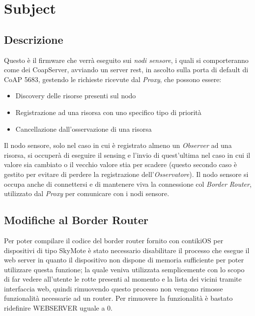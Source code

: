 \chapter{Subject}
  \section{Descrizione}
    Questo è il firmware che verrà eseguito sui \textit{nodi sensore}, i quali si comporteranno come dei CoapServer, avviando un server rest, in ascolto sulla porta di default
    di CoAP 5683, gestendo le richieste ricevute dal \textit{Proxy}, che possono essere:
    \begin{itemize}
      \item Discovery delle risorse presenti sul nodo
      \item Registrazione ad una risorsa con uno specifico tipo di priorità
      \item Cancellazione dall'osservazione di una risorsa
    \end{itemize}
    Il nodo sensore, solo nel caso in cui è registrato almeno un \textit{Observer} ad una risorsa, si occuperà di eseguire il sensing e l'invio di quest'ultima nel caso in cui
    il valore sia cambiato o il vecchio valore stia per scadere (questo secondo caso è gestito per evitare di perdere la registrazione dell'\textit{Osservatore}).\newline
    Il nodo sensore si occupa anche di connettersi e di mantenere viva la connessione col \textit{Border Router}, utilizzato dal \textit{Proxy} per comunicare con i nodi sensore.

  \section{Modifiche al Border Router}
    Per poter compilare il codice del border router fornito con contikiOS per dispositivi di tipo SkyMote è stato necessario disabilitare il processo che esegue il web server in quanto il dispositivo non dispone di
    memoria sufficiente per poter utilizzare questa funzione; la quale veniva utilizzata semplicemente con lo scopo di far vedere all'utente le rotte presenti al momento e la lista dei vicini tramite interfaccia web,
    quindi rimuovendo questo processo non vengono rimosse funzionalità necessarie ad un router.\newline
    Per rimuovere la funzionalità è bastato ridefinire WEBSERVER uguale a 0.
    

